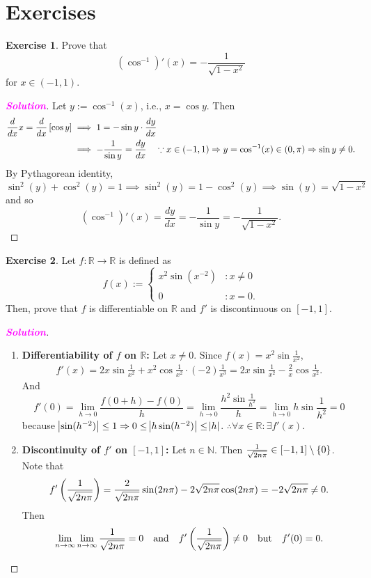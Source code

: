 \documentclass[12pt,openany]{book}
\theoremstyle{definition}
\newtheorem{exercise}{Exercise}[chapter]
\newcommand{\N}{\mathbb{N}}
\newcommand{\R}{\mathbb{R}}
\newcommand{\ie}{\textnormal{i.e.}}
\newcommand{\sol}{\textcolor{magenta}{\bf Solution}}
\begin{document}
	\section{Exercises}
	\begin{tcolorbox}[colframe=execolor, title={\color{white}\bf}]
		\begin{exercise}
			Prove that\[
			(\cos^{-1})'(x)=-\frac{1}{\sqrt{1-x^2}}
			\] for $x\in(-1,1)$.
		\end{exercise}
	\end{tcolorbox}
	\begin{proof}[\sol]
		Let $y:=\cos^{-1}(x)$, \ie, $x=\cos y$. Then \begin{align*}
			\frac{d}{dx}x=\frac{d}{dx}\sbr{\cos y}&\implies
			1=-\sin y\cdot\frac{dy}{dx}\\
			&\implies-\frac{1}{\sin y}=\frac{dy}{dx}\quad\because x\in(-1,1)\Rightarrow y=\cos^{-1}(x)\in(0,\pi)\Rightarrow\sin y\neq 0.
		\end{align*} By Pythagorean identity, \[
		\sin^2(y)+\cos^2(y)=1\implies\sin^2(y)=1-\cos^2(y)\implies\sin(y)=\sqrt{1-x^2}
		\] and so \[
		(\cos^{-1})'(x)=\frac{dy}{dx}=-\frac{1}{\sin y}=-\frac{1}{\sqrt{1-x^2}}.
		\]
	\end{proof}
	\vspace{20pt}
	\begin{tcolorbox}[colframe=execolor, title={\color{white}\bf }]
		\begin{exercise}
			Let $f:\R\to\R$ is defined as \[
			f(x):=\begin{cases}
				x^2\sin(x^{-2}) &:x\neq 0\\
				\\
				0 &:x=0.
			\end{cases}
			\] Then, prove that $f$ is differentiable on $\R$ and $f'$ is discontinuous on $[-1,1]$.
		\end{exercise}
	\end{tcolorbox}
	\begin{proof}[\sol]
		\ \begin{enumerate}[(1)]
			\item \textbf{Differentiability of $f$ on $\R$:}
				Let $x\neq 0$. Since $f(x)=x^2\sin\frac{1}{x^2}$, \begin{align*}
				f'(x)=2x\sin\frac{1}{x^2}+x^2\cos\frac{1}{x^2}\cdot(-2)\frac{1}{x^3}
				=2x\sin\frac{1}{x^2}-\frac{2}{x}\cos\frac{1}{x^2}.
			\end{align*} And
			\[
			f'(0)=\lim\limits_{h\to 0}\frac{f(0+h)-f(0)}{h}=\lim\limits_{h\to 0}\frac{h^2\sin\frac{1}{h^2}}{h}=\lim\limits_{h\to 0}h\sin\frac{1}{h^2}=0
			\] because $\abs{\sin(h^{-2})}\leq 1\Rightarrow 0\leq\abs{h\sin(h^{-2})}\leq\abs{h}$. $\therefore\forall x\in\R:\exists f'(x)$.
			\newpage
			\item \textbf{Discontinuity of $f'$ on $[-1,1]$:} Let $n\in\N$. Then $\frac{1}{\sqrt{2n\pi}}\in[-1,1]\setminus\set{0}$. Note that \[
			f'\del{\frac{1}{\sqrt{2n\pi}}}=\frac{2}{\sqrt{2n\pi}}\sin(2n\pi)-2\sqrt{2n\pi}\cos(2n\pi)=-2\sqrt{2n\pi}\neq 0.
			\] Then \[
			\lim\limits_{n\to\infty}
			\lim\limits_{n\to\infty}\frac{1}{\sqrt{2n\pi}}=0\quad\text{and}\quad f'\del{\frac{1}{\sqrt{2n\pi}}}\neq 0\quad\text{but}\quad f'(0)=0.
			\]
		\end{enumerate}
	\end{proof}
\end{document}
